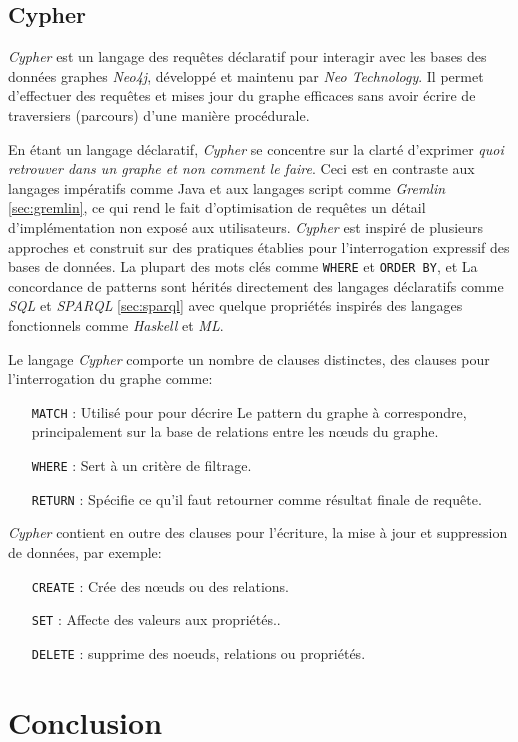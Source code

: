   \subsection{Cypher}
  \label{sec:cypher}
  \emph{Cypher} \cite{cypher-docs} est un langage des requêtes
  déclaratif pour interagir avec les bases des données graphes
  \emph{Neo4j}, développé et maintenu par \emph{Neo Technology}. Il
  permet d'effectuer des requêtes et mises jour du graphe efficaces
  sans avoir écrire de traversiers (parcours) d'une manière
  procédurale.

  En étant un langage déclaratif, \emph{Cypher} se concentre sur la
  clarté d'exprimer \textit{quoi retrouver dans un graphe et non
    comment le faire}. Ceci est en contraste aux langages impératifs
  comme Java et aux langages script comme \emph{Gremlin}
  \ref{sec:gremlin}, ce qui rend le fait d'optimisation de requêtes un
  détail d'implémentation non exposé aux utilisateurs. \emph{Cypher}
  est inspiré de plusieurs approches et construit sur des pratiques
  établies pour l'interrogation expressif des bases de données. La
  plupart des mots clés comme \verb|WHERE| et \verb|ORDER BY|, et La
  concordance de patterns sont hérités directement des langages
  déclaratifs comme \emph{SQL} et \emph{SPARQL} \ref{sec:sparql} avec
  quelque propriétés inspirés des langages fonctionnels comme
  \emph{Haskell} et \emph{ML}.

  Le langage \emph{Cypher} comporte un nombre de clauses distinctes,
  des clauses pour l'interrogation du graphe comme:
  \begin{itemize}
  \item [\texttt{MATCH}]: Utilisé pour pour décrire Le pattern du graphe
    à correspondre, principalement sur la base de relations entre les
    nœuds du graphe.
  \item [\texttt{WHERE}]: Sert à un critère de filtrage.
  \item [\texttt{RETURN}]: Spécifie ce qu'il faut retourner comme
    résultat finale de requête.
  \end{itemize}

  \emph{Cypher} contient en outre des clauses pour l'écriture, la mise
  à jour et suppression de données, par exemple:

  \begin{itemize}
  \item [\texttt{CREATE}]: Crée des nœuds ou des relations.
  \item [\texttt{SET}]: Affecte des valeurs aux propriétés..
  \item [\texttt{DELETE}]: supprime des noeuds, relations ou propriétés.
  \end{itemize}



  \section{Conclusion}

